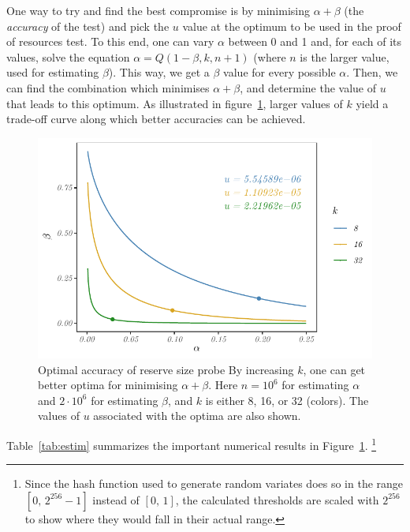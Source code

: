 One way to try and find the best compromise is by minimising
$\alpha + \beta$ (the \emph{accuracy} of the test) and pick the $u$ value at the optimum to be used in the proof of resources test. To this end, one
can vary $\alpha$ between 0 and 1 and, for each of its values, solve
the equation $\alpha = Q(1-\beta, k, n+1)$ (where $n$ is the larger
value, used for estimating $\beta$). This way, we get a $\beta$
value for every possible $\alpha$. Then, we can find the combination
which minimises $\alpha + \beta$, and determine the value of $u$
that leads to this optimum. As illustrated in
figure~\ref{fig-optim}, larger values of $k$ yield a trade-off curve along which
better accuracies can be achieved.

\begin{figure}[!ht]
  \centering
  \includegraphics[width=.7\textwidth]{fig/fig-optim-1.pdf}
  \caption[Optimal accuracy of reserve size probe]{Optimal accuracy of reserve size probe By increasing $k$, one can get better optima for minimising $\alpha + \beta$. Here $n = 10^6$ for estimating $\alpha$ and $2\cdot 10^6$ for estimating $\beta$, and $k$ is either 8, 16, or 32 (colors). The values of $u$ associated with the optima are also shown.}
  \label{fig-optim}
\end{figure}



Table~\ref{tab:estim} summarizes the important numerical results in
Figure~\ref{fig-optim}.%
%
\footnote{Since the hash function used to generate random
variates does so in the range $[0, \, 2^{256}-1]$ instead of
$[0, \, 1]$, the calculated thresholds are scaled with $2^{256}$ to
show where they would fall in their actual range.}


